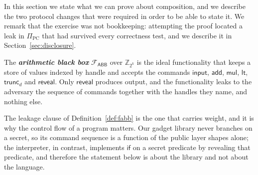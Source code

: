 \documentclass[11pt]{article}
\newcommand{\ib}[1]{\textbf{\emph{#1}}}
\newcommand{\Z}{\mathbb{Z}}
\newcommand{\Fabb}{\mathcal{F}_{\mathsf{ABB}}}
\begin{document}
In this section we state what we can prove about composition, and we describe the two
protocol changes that were required in order to be able to state it. We remark that the
exercise was not bookkeeping: attempting the proof located a leak in $\Pi_{\mathrm{PC}}$ that
had survived every correctness test, and we describe it in Section~\ref{sec:disclosure}.

\begin{definition}
\label{def:fabb}
The \ib{arithmetic black box} $\Fabb$ over $\Z_{2^k}$ is the ideal functionality that keeps a
store of values indexed by handle and accepts the commands $\mathsf{input}$, $\mathsf{add}$,
$\mathsf{mul}$, $\mathsf{lt}$, $\mathsf{trunc}_d$ and $\mathsf{reveal}$. Only
$\mathsf{reveal}$ produces output, and the functionality leaks to the adversary the sequence
of commands together with the handles they name, and nothing else.
\end{definition}

The leakage clause of Definition~\ref{def:fabb} is the one that carries weight, and it is why
the control flow of a program matters. Our gadget library never branches on a secret, so its
command sequence is a function of the public layer shapes alone; the interpreter, in contrast,
implements $\mathsf{if}$ on a secret predicate by revealing that predicate, and therefore the
statement below is about the library and not about the language.
\end{document}
